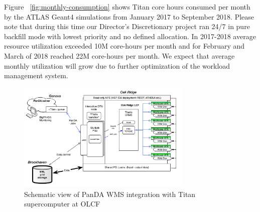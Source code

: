 Figure ~\ref{fig:monthly-consumption} shows Titan core hours consumed per month by the ATLAS Geant4 simulations
from January 2017 to September 2018. Please note that during this time our
Director's Discretionary project ran 24/7 in pure backfill mode with lowest
priority and no defined allocation. In 2017-2018 average resource utilization
exceeded 10M core-hours per month and for February and March of 2018 reached
22M core-hours per month. We expect that average monthly utilization will grow
due to further optimization of the workload management system.




\begin{figure}
  \includegraphics[width=0.75\textwidth]{images/Figure_5.png}
\caption{Schematic view of PanDA WMS integration with Titan supercomputer at OLCF}
\label{fig:implementation}
\end{figure}


